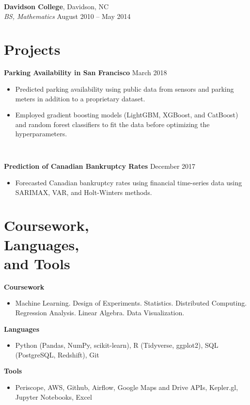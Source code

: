 \documentclass[line, margin]{res}
\begin{document}
\begin{resume}
	\textbf{Davidson College}, Davidson, NC \vspace{1mm}\\\vspace{-1mm}
	\textsl{BS, Mathematics} \hfill {August 2010 -- May 2014}


\section{Projects}
	\textbf{Parking Availability in San Francisco} \hfill{March 2018}
	\begin{itemize}
		\item Predicted parking availability using public data from sensors and parking meters in addition to a proprietary dataset.
		\item Employed gradient boosting models (LightGBM, XGBoost, and CatBoost) and random forest classifiers to fit the data before optimizing the hyperparameters. %
	\end{itemize} \

	\textbf{Prediction of Canadian Bankruptcy Rates} \hfill{December 2017}
	\begin{itemize}
		\item Forecasted Canadian bankruptcy rates using financial time-series data using SARIMAX, VAR, and Holt-Winters methods.
	\end{itemize}
 
\section{Coursework, \\ Languages, \\ and Tools} 
	\textbf{Coursework} \
	\begin{itemize}
		\item Machine Learning. Design of Experiments. Statistics. Distributed Computing. Regression Analysis. Linear Algebra. Data Visualization. 
	\end{itemize}
	\textbf{Languages} \
	\begin{itemize}
		\item Python (Pandas, NumPy, scikit-learn), R (Tidyverse, ggplot2), SQL (PostgreSQL, Redshift), Git %
	\end{itemize} 
	\textbf{Tools} \
	\begin{itemize}
		\item Periscope, AWS, Github, Airflow, Google Maps and Drive APIs, Kepler.gl, Jupyter Notebooks, Excel
	\end{itemize}
		

\end{resume}
\end{document}

